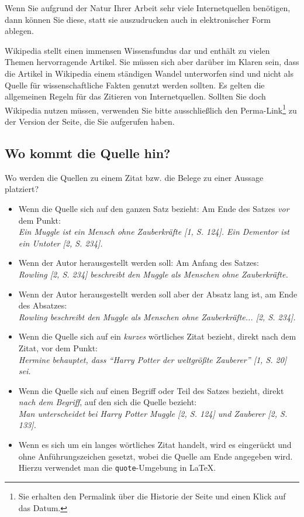 \documentclass[conference,compsoc,final,a4paper]{IEEEtran}
\begin{document}
Wenn Sie aufgrund der Natur Ihrer Arbeit sehr viele Internetquellen benötigen, dann können Sie diese, statt sie auszudrucken auch in elektronischer Form ablegen.

Wikipedia stellt einen immensen Wissensfundus dar und enthält zu vielen Themen hervorragende Artikel. Sie müssen sich aber darüber im Klaren sein, dass die Artikel in Wikipedia einem ständigen Wandel unterworfen sind und nicht als Quelle für wissenschaftliche Fakten genutzt werden sollten. Es gelten die allgemeinen Regeln für das Zitieren von Internetquellen. Sollten Sie doch Wikipedia nutzen müssen, verwenden Sie bitte ausschließlich den Perma-Link\footnote{Sie erhalten den Permalink über die Historie der Seite und einen Klick auf das Datum.} zu der Version der Seite, die Sie aufgerufen haben.

\subsection{Wo kommt die Quelle hin?}
Wo werden die Quellen zu einem Zitat bzw. die Belege zu einer Aussage platziert?

\begin{itemize}
\item Wenn die Quelle sich auf den ganzen Satz bezieht: Am Ende des Satzes \textit{vor} dem Punkt:\\ \textit{Ein Muggle ist ein Mensch ohne Zauberkräfte [1, S. 124]. Ein Dementor ist ein Untoter [2, S. 234].}
\item Wenn der Autor herausgestellt werden soll: Am Anfang des Satzes:\\ \textit{Rowling [2, S. 234] beschreibt den Muggle als Menschen ohne Zauberkräfte.}
\item Wenn der Autor herausgestellt werden soll aber der Absatz lang ist, am Ende des Absatzes:\\ \textit{Rowling beschreibt den Muggle als Menschen ohne Zauberkräfte... [2, S. 234].}
\item Wenn die Quelle sich auf ein \textit{kurzes} wörtliches Zitat bezieht, direkt nach dem Zitat, vor dem Punkt:\\ \textit{Hermine behauptet, dass \enquote{Harry Potter der weltgrößte Zauberer} [1, S. 20] sei.}
\item Wenn die Quelle sich auf einen Begriff oder Teil des Satzes bezieht, direkt \textit{nach dem Begriff}, auf den sich die Quelle bezieht:\\ \textit{Man unterscheidet bei Harry Potter Muggle [2, S. 124] und Zauberer [2, S. 133].}
\item Wenn es sich um ein langes wörtliches Zitat handelt, wird es eingerückt und ohne Anführungszeichen gesetzt, wobei die Quelle am Ende angegeben wird. Hierzu verwendet man die \texttt{quote}-Umgebung in \LaTeX.
\end{itemize}
\end{document}
